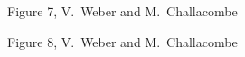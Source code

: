 \documentclass[prl,twocolumn,twocolumngrid,superbib]{revtex4} %
\begin{document}
{\clearpage

\begin{center}
Figure 7, V.~Weber  and M.~Challacombe \\[1.cm]
\end{center}

\clearpage

\begin{center}
Figure 8, V.~Weber  and M.~Challacombe \\[1.cm]
\end{center}



} %

\end{document}

